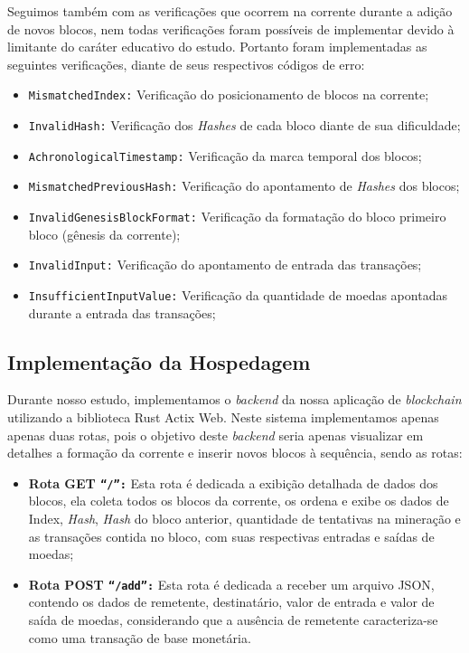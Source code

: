 \documentclass[article,12pt,oneside,a4paper,english,brazil]{unifil}
\begin{document}
\begin{Spacing}{1.5}
Seguimos também com as verificações que ocorrem na corrente durante a adição de novos blocos, nem todas verificações foram possíveis de implementar devido à limitante do caráter educativo do estudo. Portanto foram implementadas as seguintes verificações, diante de seus respectivos códigos de erro:

\begin{itemize}
    \item \texttt{MismatchedIndex:} Verificação do posicionamento de blocos na corrente;
    \item \texttt{InvalidHash:} Verificação dos \textit{Hashes} de cada bloco diante de sua dificuldade;
    \item \texttt{AchronologicalTimestamp:} Verificação da marca temporal dos blocos;
    \item \texttt{MismatchedPreviousHash:} Verificação do apontamento de \textit{Hashes} dos blocos;
    \item \texttt{InvalidGenesisBlockFormat:} Verificação da formatação do bloco primeiro bloco (gênesis da corrente);
    \item \texttt{InvalidInput:} Verificação do apontamento de entrada das transações;
    \item \texttt{InsufficientInputValue:} Verificação da quantidade de moedas apontadas durante a entrada das transações;

\end{itemize}

\subsection*{Implementação da Hospedagem}

Durante nosso estudo, implementamos o \textit{backend} da nossa aplicação de \textit{blockchain} utilizando a biblioteca Rust Actix Web. Neste sistema implementamos apenas apenas duas rotas, pois o objetivo deste \textit{backend} seria apenas visualizar em detalhes a formação da corrente e inserir novos blocos à sequência, sendo as rotas:

\begin{itemize}
\item \textbf{Rota GET \texttt{``/'':}} Esta rota é dedicada a exibição detalhada de dados dos blocos, ela coleta todos os blocos da corrente, os ordena e exibe os dados de Index, \textit{Hash}, \textit{Hash} do bloco anterior, quantidade de tentativas na mineração e as transações contida no bloco, com suas respectivas entradas e saídas de moedas;
\item \textbf{Rota POST \texttt{``/add'':}} Esta rota é dedicada a receber um arquivo JSON, contendo os dados de remetente, destinatário, valor de entrada e valor de saída de moedas, considerando que a ausência de remetente caracteriza-se como uma transação de base monetária.


\end{itemize}
\end{Spacing}
\end{document}

